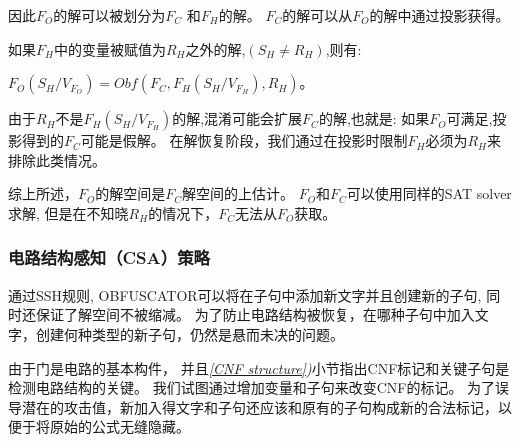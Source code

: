 因此$F_O$的解可以被划分为$F_C$ 和$F_H$的解。
$F_C$的解可以从$F_O$的解中通过投影获得。

如果$F_H$中的变量被赋值为$R_H$之外的解,$(S_H\neq R_H)$,则有:

$F_O(S_H/V_{F_O})
=Obf(F_C,F_H(S_H/V_{F_H}),R_H)$。

由于$R_H$不是$F_H(S_H/V_{F_H})$的解,混淆可能会扩展$F_C$的解,也就是:
如果$F_O$可满足,投影得到的$F_C$可能是假解。
在解恢复阶段，我们通过在投影时限制$F_H$必须为$R_H$来排除此类情况。

综上所述，$F_O$的解空间是$F_C$解空间的上估计。
$F_O$和$F_C$可以使用同样的SAT solver求解,
但是在不知晓$R_H$的情况下，$F_C$无法从$F_O$获取。

\subsubsection{电路结构感知（CSA）策略}\label{embeded strategy}
%
%

通过SSH规则, OBFUSCATOR可以将在子句中添加新文字并且创建新的子句,
同时还保证了解空间不被缩减。
为了防止电路结构被恢复，在哪种子句中加入文字，创建何种类型的新子句，仍然是悬而未决的问题。

由于门是电路的基本构件，
并且\textit{\ref{CNF structure})}小节指出CNF标记和关键子句是检测电路结构的关键。
我们试图通过增加变量和子句来改变CNF的标记。
为了误导潜在的攻击值，新加入得文字和子句还应该和原有的子句构成新的合法标记，以便于将原始的公式无缝隐藏。

